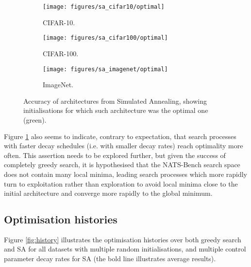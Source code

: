 \documentclass{article}
\begin{document}
\begin{figure}[hp]
    \begin{subfigure}[b]{0.6\textwidth}
        \centering
        \texttt{[image: figures/sa\_cifar10/optimal]}
        \caption{CIFAR-10.}
    \end{subfigure}
    \hfill
    \begin{subfigure}[b]{0.6\textwidth}
        \centering
        \texttt{[image: figures/sa\_cifar100/optimal]}
        \caption{CIFAR-100.}
    \end{subfigure}
    \hfill
    \begin{center}
        \begin{subfigure}[b]{0.6\textwidth}
            \centering
            \texttt{[image: figures/sa\_imagenet/optimal]}
            \caption{ImageNet.}
        \end{subfigure}
    \end{center}
    \caption{
        Accuracy of architectures from Simulated Annealing,
        showing initialisations for which such architecture was
        the optimal one (green).
    }
    \label{fig:sa:optimal}
\end{figure}

Figure \ref{fig:sa:optimal} also seems to indicate, contrary
to expectation, that search processes with faster decay schedules
(i.e. with smaller decay rates) reach optimality more often.
This assertion needs to be explored further, but given the success
of completely greedy search, it is hypothesised that the NATS-Bench
search space does not contain many local minima, leading search
processes which more rapidly turn to exploitation rather than
exploration to avoid local minima close to the initial architecture
and converge more rapidly to the global minimum.

\subsection{Optimisation histories}
Figure \ref{fig:history} illustrates the optimisation histories
over both greedy search and SA for all datasets with multiple random
initialisations, and multiple control parameter decay rates for SA
(the bold line illustrates average results).
\end{document}
